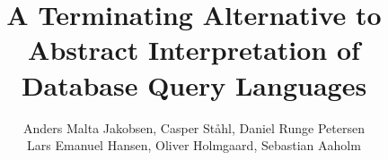 
\title{A Terminating Alternative to Abstract Interpretation of Database Query Languages}



\author{%
    Anders Malta Jakobsen,
    Casper Ståhl,
    Daniel Runge Petersen \\
    Lars Emanuel Hansen,
    Oliver Holmgaard,
    Sebastian Aaholm
}
